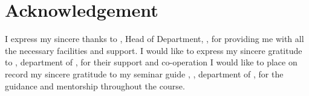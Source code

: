\chapter*{Acknowledgement}%
%




 I express my sincere thanks to \textbf{ \hod}, Head of Department, \dept, for providing  me with all the necessary facilities and support.
I would like to express my sincere gratitude to \textbf{\semcordinatorA},  department of \hspace*{2pt} \dept, \hspace*{2pt} for their support and co-operation
I would like to place on record my sincere gratitude to my seminar guide\hspace*{3pt} \textbf{\guide}, \guidedes, department of \dept, for the guidance and mentorship throughout the course.



\vspace*{30pt}
\begin{flushright}
	\textbf{\author}
\end{flushright}
\thispagestyle{plain}
